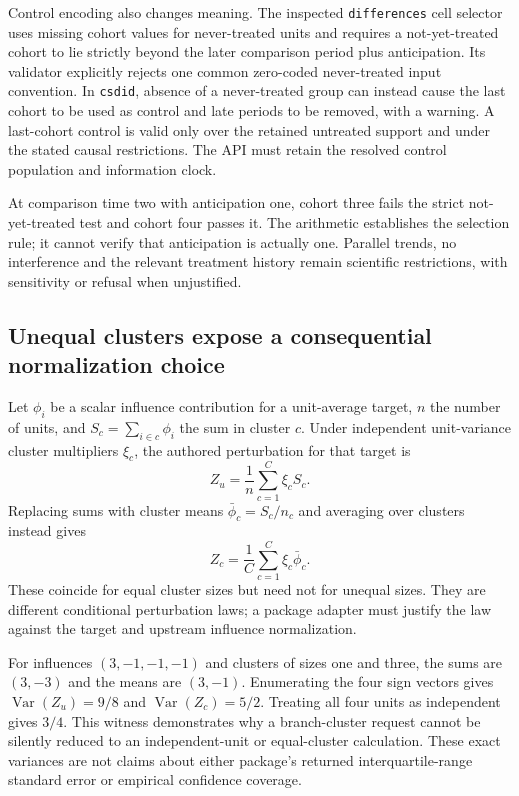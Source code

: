Control encoding also changes meaning. The inspected \texttt{differences}
cell selector uses missing cohort values for never-treated units and requires
a not-yet-treated cohort to lie strictly beyond the later comparison period
plus anticipation. Its validator explicitly rejects one common zero-coded
never-treated input convention. In \texttt{csdid}, absence of a never-treated
group can instead cause the last cohort to be used as control and late
periods to be removed, with a warning. A last-cohort control is valid only
over the retained untreated support and under the stated causal restrictions.
The API must retain the resolved control population and information clock.
\citep{exec24_panelpy_differences,exec24_panelpy_csdid}

At comparison time two with anticipation one, cohort three fails the strict
not-yet-treated test and cohort four passes it. The arithmetic establishes
the selection rule; it cannot verify that anticipation is actually one.
Parallel trends, no interference and the relevant treatment history remain
scientific restrictions, with sensitivity or refusal when unjustified.
\citep{exec24_panelpy_contract}

\subsection{Unequal clusters expose a consequential normalization choice}
Let $\phi_i$ be a scalar influence contribution for a unit-average target,
$n$ the number of units, and $S_c=\sum_{i\in c}\phi_i$ the sum in cluster
$c$. Under independent unit-variance cluster multipliers $\xi_c$, the
authored perturbation for that target is
\[ Z_u=\frac{1}{n}\sum_{c=1}^{C}\xi_c S_c. \]
Replacing sums with cluster means $\bar\phi_c=S_c/n_c$ and averaging over
clusters instead gives
\[ Z_c=\frac{1}{C}\sum_{c=1}^{C}\xi_c\bar\phi_c. \]
These coincide for equal cluster sizes but need not for unequal sizes.
They are different conditional perturbation laws; a package adapter must
justify the law against the target and upstream influence normalization.
\citep{exec24_panelpy_contract}

For influences $(3,-1,-1,-1)$ and clusters of sizes one and three, the sums
are $(3,-3)$ and the means are $(3,-1)$. Enumerating the four sign vectors
gives $\operatorname{Var}(Z_u)=9/8$ and
$\operatorname{Var}(Z_c)=5/2$. Treating all four units as independent gives
$3/4$. This witness demonstrates why a branch-cluster request cannot be
silently reduced to an independent-unit or equal-cluster calculation.
These exact variances are not claims about either package's returned
interquartile-range standard error or empirical confidence coverage.
\citep{exec24_panelpy_contract}

